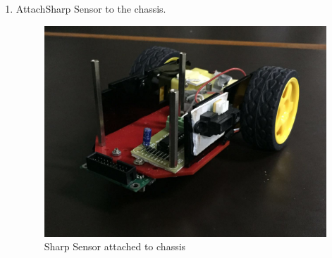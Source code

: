 \documentclass[a4paper,12pt,oneside]{book}
\begin{document}
\begin{enumerate}
\item AttachSharp Sensor to the chassis.
\begin{figure}[h]
        \centering
        \includegraphics[scale=0.16]{a_Sharp}
        \caption{Sharp Sensor attached to chassis}
      \end{figure}
      \newpage


\end{enumerate}
\end{document}
